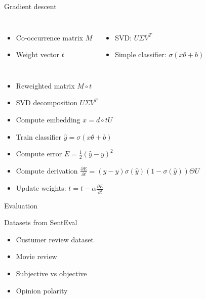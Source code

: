 \documentclass[xcolor={table}]{beamer}
\begin{document}
\begin{frame}{Gradient descent}
    \begin{columns}    
    \begin{itemize}
        \item Co-occurrence matrix $M$
        \item Weight vector $t$
    \end{itemize}
    \begin{itemize}
        \item SVD: $U \Sigma V^T$
        \item Simple classifier: $\sigma (x \theta + b)$
    \end{itemize}    
    \end{columns}

    \begin{block}{}
    \begin{itemize}
        \item Reweighted matrix $M \circ t$
        \item SVD decomposition $U \Sigma V^T$
        \item Compute embedding $x = d \circ t U$
        \item Train classifier $\hat{y} = \sigma (x \theta + b)$
        \item Compute error $E = \frac{1}{2}(\hat{y}-y)^2$
        \item Compute derivation $\frac{\partial E}{\partial t} = (\hat{y} -y) \sigma(\hat{y}) (1-\sigma(\hat{y}))\Theta U$
        \item Update weights: $t = t - \alpha \frac{\partial E}{\partial t}$
    \end{itemize}    
    \end{block}
\end{frame} 

\begin{frame}{Evaluation}
    \begin{block}{Datasets from SentEval \cite{conneau2017supervised}}
        \begin{itemize}
            \item Custumer review dataset
            \item Movie review
            \item Subjective vs objective
            \item Opinion polarity            
        \end{itemize}
    \end{block}
    
    
\end{frame} 
\end{document}
